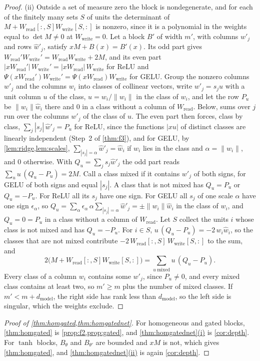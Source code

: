 \documentclass[10pt]{article}
\theoremstyle{definition}
\theoremstyle{remark}
\newcommand{\Wread}{W_{\mathrm{read}}}
\newcommand{\Wwrite}{W_{\mathrm{write}}}
\newcommand{\dm}{d_{\mathrm{model}}}
\newcommand{\norm}[1]{\lVert #1\rVert}
\DeclareRobustCommand{\cpref}[2]{\hyperref[#1:#2]{\cref*{#1}(#2)}}
\begin{document}
\begin{proof}
(ii) Outside a set of measure zero the block is nondegenerate, and for each of the finitely many sets $S$ of units the determinant of $M + \Wread[{:},S]\Wwrite[S,{:}]$ is nonzero, since it is a polynomial in the weights equal to $\det M \neq 0$ at $\Wwrite = 0$. Let a block $B'$ of width $m'$, with columns $w'_j$ and rows $\hat w'_j$, satisfy $xM + B(x) = B'(x)$. Its odd part gives $\Wread'\Wwrite' = \Wread\Wwrite + 2M$, and its even part $|x\Wread'|\,\Wwrite' = |x\Wread|\,\Wwrite$ for ReLU and $\Psi(x\Wread')\Wwrite' = \Psi(x\Wread)\Wwrite$ for GELU. Group the nonzero columns $w'_j$ and the columns $w_i$ into classes of collinear vectors, write $w'_j = s_ju$ with a unit column $u$ of the class, $u = w_i/\norm{w_i}$ in the class of $w_i$, and let the row $P_u$ be $\norm{w_i}\hat w_i$ there and $0$ in a class without a column of $\Wread$. Below, sums over $j$ run over the columns $w'_j$ of the class of $u$. The even part then forces, class by class, $\sum_j |s_j|\,\hat w'_j = P_u$ for ReLU, since the functions $|xu|$ of distinct classes are linearly independent (Step~2 of \cref{thm:f3}), and for GELU, by \cref{lem:ridge,lem:scales}, $\sum_{|s_j| = \alpha}\hat w'_j = \hat w_i$ if $w_i$ lies in the class and $\alpha = \norm{w_i}$, and $0$ otherwise. With $Q_u = \sum_j s_j\hat w'_j$ the odd part reads $\sum_u u\,(Q_u - P_u) = 2M$. Call a class mixed if it contains $w'_j$ of both signs, for GELU of both signs and equal $|s_j|$. A class that is not mixed has $Q_u = P_u$ or $Q_u = -P_u$. For ReLU all its $s_j$ have one sign. For GELU all $s_j$ of one scale $\alpha$ have one sign $\epsilon_\alpha$, so $Q_u = \sum_\alpha \epsilon_\alpha\,\alpha\sum_{|s_j| = \alpha}\hat w'_j = \pm\norm{w_i}\hat w_i$ in the class of $w_i$, and $Q_u = 0 = P_u$ in a class without a column of $\Wread$. Let $S$ collect the units $i$ whose class is not mixed and has $Q_u = -P_u$. For $i \in S$, $u\,(Q_u - P_u) = -2\,w_i\hat w_i$, so the classes that are not mixed contribute $-2\,\Wread[{:},S]\,\Wwrite[S,{:}]$ to the sum, and
\[
2\big(M + \Wread[{:},S]\Wwrite[S,{:}]\big) = \sum_{u\ \mathrm{mixed}} u\,(Q_u - P_u) .
\]
Every class of a column $w_i$ contains some $w'_j$, since $P_u \neq 0$, and every mixed class contains at least two, so $m' \ge m$ plus the number of mixed classes. If $m' < m + \dm$, the right side has rank less than $\dm$, so the left side is singular, which the weights exclude.
\end{proof}

\thmAbsorbHom*
\thmAbsorbHomNet*

\begin{proof}[Proof of \cref{thm:homgated,thm:homgatednet}]
For homogeneous and gated blocks, \cref{thm:homgated} is \cref{prop:f2,prop:gated}, and \cpref{thm:homgatednet}{i} is \cref{cor:depth}. For $\tanh$ blocks, $B_\theta$ and $B_{\theta'}$ are bounded and $xM$ is not, which gives \cref{thm:homgated}, and \cpref{thm:homgatednet}{ii} is again \cref{cor:depth}.
\end{proof}
\end{document}
